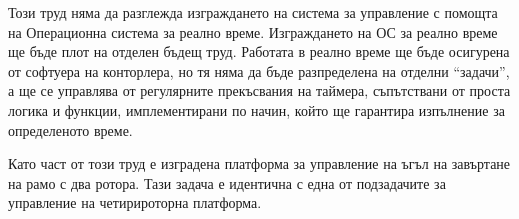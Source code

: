 Този труд няма да разглежда изграждането на система за управление с помощта на Операционна система за реално време. 
Изграждането на ОС за реално време ще бъде плот на отделен бъдещ труд.
Работата в реално време ще бъде осигурена от софтуера на конторлера, но тя няма да бъде разпределена на отделни \enquote{задачи}, а ще се управлява от регулярните прекъсвания на таймера, съпътствани от проста логика и функции, имплементирани по начин, който ще гарантира изпълнение за определеното време.

Като част от този труд е изградена платформа за управление на ъгъл на завъртане на рамо с два ротора.
Тази задача е идентична с една от подзадачите за управление на четирироторна платформа.
